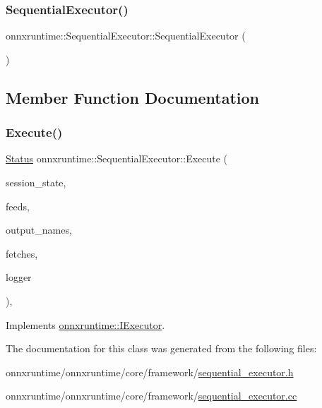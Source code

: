\subsubsection{\texorpdfstring{Sequential\+Executor()}{SequentialExecutor()}}
{\footnotesize\ttfamily onnxruntime\+::\+Sequential\+Executor\+::\+Sequential\+Executor (\begin{DoxyParamCaption}{ }\end{DoxyParamCaption})\hspace{0.3cm}{\ttfamily [default]}}



\subsection{Member Function Documentation}
\mbox{\label{classonnxruntime_1_1SequentialExecutor_ade54efc80e70d9e2d1d5024abe40a60c}} 
\subsubsection{\texorpdfstring{Execute()}{Execute()}}
{\footnotesize\ttfamily \mbox{\hyperlink{classonnxruntime_1_1common_1_1Status}{Status}} onnxruntime\+::\+Sequential\+Executor\+::\+Execute (\begin{DoxyParamCaption}\item[{const \mbox{\hyperlink{classonnxruntime_1_1SessionState}{Session\+State}} \&}]{session\+\_\+state,  }\item[{const \mbox{\hyperlink{namespaceonnxruntime_a48b01f0410ec8d693dbd40d1132bd66c}{Name\+M\+L\+Val\+Map}} \&}]{feeds,  }\item[{const std\+::vector$<$ std\+::string $>$ \&}]{output\+\_\+names,  }\item[{std\+::vector$<$ \mbox{\hyperlink{classonnxruntime_1_1MLValue}{M\+L\+Value}} $>$ \&}]{fetches,  }\item[{const \mbox{\hyperlink{classonnxruntime_1_1logging_1_1Logger}{logging\+::\+Logger}} \&}]{logger }\end{DoxyParamCaption})\hspace{0.3cm}{\ttfamily [override]}, {\ttfamily [virtual]}}



Implements \mbox{\hyperlink{classonnxruntime_1_1IExecutor_a72794c9d86c407a835858c739ac4fb3e}{onnxruntime\+::\+I\+Executor}}.



The documentation for this class was generated from the following files\+:\begin{DoxyCompactItemize}
\item 
onnxruntime/onnxruntime/core/framework/\mbox{\hyperlink{sequential__executor_8h}{sequential\+\_\+executor.\+h}}\item 
onnxruntime/onnxruntime/core/framework/\mbox{\hyperlink{sequential__executor_8cc}{sequential\+\_\+executor.\+cc}}\end{DoxyCompactItemize}

